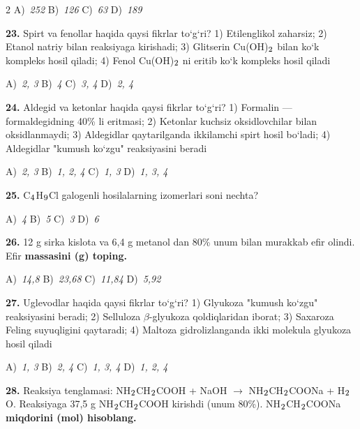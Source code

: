 \documentclass[11pt,a4paper]{article}
\renewcommand{\textsubscript}[1]{\ensuremath{_{\text{\fontsize{8}{8}\selectfont #1}}}}
\begin{document}
\begin{multicols}{2}
\noindent A)~\textsl{252} \hfill B)~\textsl{126} \hfill C)~\textsl{63} \hfill D)~\textsl{189}\par
\vspace{4pt}
\noindent\textbf{23.} Spirt va fenollar haqida qaysi fikrlar to`g`ri? 1) Etilenglikol zaharsiz; 2) Etanol natriy bilan reaksiyaga kirishadi; 3) Glitserin Cu(OH)\textsubscript{2} bilan ko`k kompleks hosil qiladi; 4) Fenol Cu(OH)\textsubscript{2} ni eritib ko`k kompleks hosil qiladi

\noindent A)~\textsl{2, 3} \hfill B)~\textsl{4} \hfill C)~\textsl{3, 4} \hfill D)~\textsl{2, 4}\par
\vspace{4pt}
\noindent\textbf{24.} Aldegid va ketonlar haqida qaysi fikrlar to`g`ri? 1) Formalin --- formaldegidning 40\% li eritmasi; 2) Ketonlar kuchsiz oksidlovchilar bilan oksidlanmaydi; 3) Aldegidlar qaytarilganda ikkilamchi spirt hosil bo`ladi; 4) Aldegidlar "kumush ko`zgu" reaksiyasini beradi

\noindent A)~\textsl{2, 3} \hfill B)~\textsl{1, 2, 4} \hfill C)~\textsl{1, 3} \hfill D)~\textsl{1, 3, 4}\par
\vspace{4pt}
\noindent\textbf{25.} C\textsubscript{4}H\textsubscript{9}Cl galogenli hosilalarning izomerlari soni nechta?

\noindent A)~\textsl{4} \hfill B)~\textsl{5} \hfill C)~\textsl{3} \hfill D)~\textsl{6}\par
\vspace{4pt}
\noindent\textbf{26.} 12 g sirka kislota va 6,4 g metanol dan 80\% unum bilan murakkab efir olindi. Efir \textbf{massasini (g) toping.}

\noindent A)~\textsl{14,8} \hfill B)~\textsl{23,68} \hfill C)~\textsl{11,84} \hfill D)~\textsl{5,92}\par
\vspace{4pt}
\noindent\textbf{27.} Uglevodlar haqida qaysi fikrlar to`g`ri? 1) Glyukoza "kumush ko`zgu" reaksiyasini beradi; 2) Selluloza $\beta$-glyukoza qoldiqlaridan iborat; 3) Saxaroza Feling suyuqligini qaytaradi; 4) Maltoza gidrolizlanganda ikki molekula glyukoza hosil qiladi

\noindent A)~\textsl{1, 3} \hfill B)~\textsl{2, 4} \hfill C)~\textsl{1, 3, 4} \hfill D)~\textsl{1, 2, 4}\par
\vspace{4pt}
\noindent\textbf{28.} Reaksiya tenglamasi: NH\textsubscript{2}CH\textsubscript{2}COOH + NaOH $\to$ NH\textsubscript{2}CH\textsubscript{2}COONa + H\textsubscript{2}O. Reaksiyaga 37,5 g NH\textsubscript{2}CH\textsubscript{2}COOH kirishdi (unum 80\%). NH\textsubscript{2}CH\textsubscript{2}COONa \textbf{miqdorini (mol) hisoblang.}


\end{multicols}
\end{document}
